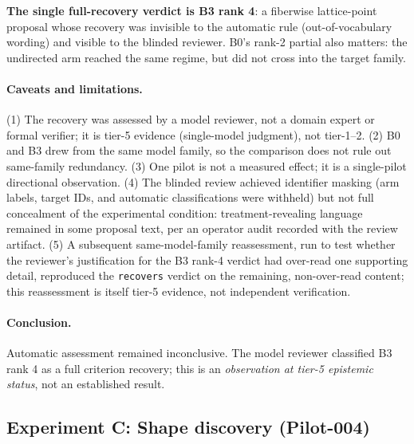 \documentclass[11pt]{article}
\theoremstyle{gowthm}
\theoremstyle{gowplain}
\begin{document}
\textbf{The single full-recovery verdict is B3 rank 4}: a fiberwise lattice-point
proposal whose recovery was invisible to the automatic rule (out-of-vocabulary
wording) and visible to the blinded reviewer. B0's rank-2 partial also matters:
the undirected arm reached the same regime, but did not cross into the target
family.

\paragraph{Caveats and limitations.}
(1) The recovery was assessed by a model reviewer, not a domain expert or
formal verifier; it is tier-5 evidence (single-model judgment), not
tier-1--2. (2) B0 and B3 drew from the same model family, so the comparison
does not rule out same-family redundancy. (3) One pilot is not a measured
effect; it is a single-pilot directional observation. (4) The blinded review
achieved identifier masking (arm labels, target IDs, and automatic
classifications were withheld) but not full concealment of the experimental
condition: treatment-revealing language remained in some proposal text,
per an operator audit recorded with the review artifact. (5) A subsequent
same-model-family reassessment, run to test whether the reviewer's
justification for the B3 rank-4 verdict had over-read one supporting detail,
reproduced the \texttt{recovers} verdict on the remaining, non-over-read
content; this reassessment is itself tier-5 evidence, not independent
verification.

\paragraph{Conclusion.}
Automatic assessment remained inconclusive. The model reviewer classified B3
rank 4 as a full criterion recovery; this is an \emph{observation at tier-5
epistemic status}, not an established result.

\subsection{Experiment C: Shape discovery (Pilot-004)}
\label{sec:results-pilot004}
\end{document}
